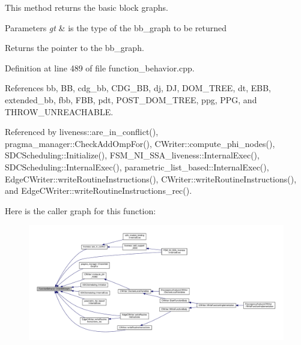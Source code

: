 This method returns the basic block graphs. 


\begin{DoxyParams}{Parameters}
{\em gt} & is the type of the bb\+\_\+graph to be returned \\
\hline
\end{DoxyParams}
\begin{DoxyReturn}{Returns}
the pointer to the bb\+\_\+graph. 
\end{DoxyReturn}


Definition at line 489 of file function\+\_\+behavior.\+cpp.



References bb, BB, cdg\+\_\+bb, C\+D\+G\+\_\+\+BB, dj, DJ, D\+O\+M\+\_\+\+T\+R\+EE, dt, E\+BB, extended\+\_\+bb, fbb, F\+BB, pdt, P\+O\+S\+T\+\_\+\+D\+O\+M\+\_\+\+T\+R\+EE, ppg, P\+PG, and T\+H\+R\+O\+W\+\_\+\+U\+N\+R\+E\+A\+C\+H\+A\+B\+LE.



Referenced by liveness\+::are\+\_\+in\+\_\+conflict(), pragma\+\_\+manager\+::\+Check\+Add\+Omp\+For(), C\+Writer\+::compute\+\_\+phi\+\_\+nodes(), S\+D\+C\+Scheduling\+::\+Initialize(), F\+S\+M\+\_\+\+N\+I\+\_\+\+S\+S\+A\+\_\+liveness\+::\+Internal\+Exec(), S\+D\+C\+Scheduling\+::\+Internal\+Exec(), parametric\+\_\+list\+\_\+based\+::\+Internal\+Exec(), Edge\+C\+Writer\+::write\+Routine\+Instructions(), C\+Writer\+::write\+Routine\+Instructions(), and Edge\+C\+Writer\+::write\+Routine\+Instructions\+\_\+rec().

Here is the caller graph for this function\+:
\nopagebreak
\begin{figure}[H]
\begin{center}
\leavevmode
\includegraphics[width=350pt]{d9/d45/classFunctionBehavior_ad95b570908f1a5d7f5b08071c1e49af3_icgraph}
\end{center}
\end{figure}
\mbox{\label{classFunctionBehavior_a084fd6d48df94ccce7451871ebf1e2ab}} 
